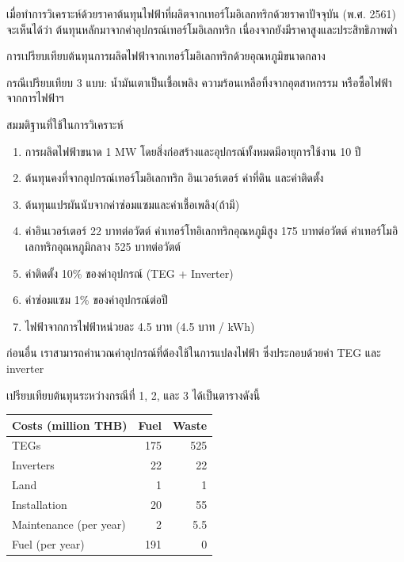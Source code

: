 \documentclass[a4paper,nobib,openany]{tufte-book}
\begin{document}
เมื่อทำการวิเคราะห์ด้วยราคาต้นทุนไฟฟ้าที่ผลิตจากเทอร์โมอิเลกทริกด้วยราคาปัจจุบัน
(พ.ศ. 2561) จะเห็นได้ว่า ต้นทุนหลักมาจากค่าอุปกรณ์เทอร์โมอิเลกทริก
เนื่องจากยังมีราคาสูงและประสิทธิภาพต่ำ

การเปรียบเทียบต้นทุนการผลิตไฟฟ้าจากเทอร์โมอิเลกทริกด้วยอุณหภูมิขนาดกลาง

กรณีเปรียบเทียบ 3 แบบ: น้ำมันเตาเป็นเชื้อเพลิง
ความร้อนเหลือทิ้งจากอุตสาหกรรม หรือซื้อไฟฟ้าจากการไฟฟ้าฯ

สมมติฐานที่ใช้ในการวิเคราะห์

\begin{enumerate}
\item การผลิตไฟฟ้าขนาด 1 MW โดยสิ่งก่อสร้างและอุปกรณ์ทั้งหมดมีอายุการใช้งาน
10 ปี

\item ต้นทุนคงที่จากอุปกรณ์เทอร์โมอิเลกทริก อินเวอร์เตอร์ ค่าที่ดิน
และค่าติดตั้ง

\item ต้นทุนแปรผันนับจากค่าซ่อมแซมและค่าเชื้อเพลิง(ถ้ามี)

\item ค่าอินเวอร์เตอร์ 22 บาทต่อวัตต์ ค่าเทอร์โทอิเลกทริกอุณหภูมิสูง 175
บาทต่อวัตต์ ค่าเทอร์โมอิเลกทริกอุณหภูมิกลาง 525 บาทต่อวัตต์

\item ค่าติดตั้ง 10\% ของค่าอุปกรณ์ (TEG + Inverter)

\item ค่าซ่อมแซม 1\% ของค่าอุปกรณ์ต่อปี

\item ไฟฟ้าจากการไฟฟ้าหน่วยละ 4.5 บาท (4.5 บาท / kWh)
\end{enumerate}

ก่อนอื่น เราสามารถคำนวณค่าอุปกรณ์ที่ต้องใช้ในการแปลงไฟฟ้า
ซึ่งประกอบด้วยค่า TEG และ inverter

เปรียบเทียบต้นทุนระหว่างกรณีที่ 1, 2, และ 3 ได้เป็นตารางดังนี้

\begin{center}
\begin{tabular}{lrr}
\toprule
Costs (million THB) & Fuel & Waste\\
\midrule
TEGs & 175 & 525\\
Inverters & 22 & 22\\
Land & 1 & 1\\
Installation & 20 & 55\\
Maintenance (per year) & 2 & 5.5\\
Fuel (per year) & 191 & 0\\
\bottomrule
\end{tabular}
\end{center}
\end{document}
